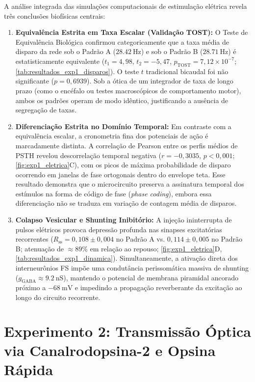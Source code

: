 \documentclass[12pt,openright,oneside,a4paper,brazil]{abntex2}
\begin{document}
A análise integrada das simulações computacionais de estimulação elétrica revela três conclusões biofísicas centrais:
\begin{enumerate}
    \item \textbf{Equivalência Estrita em Taxa Escalar (Validação TOST):} O Teste de Equivalência Biológica confirmou categoricamente que a taxa média de disparo da rede sob o Padrão A ($\qty{28.42}{\hertz}$) e sob o Padrão B ($\qty{28.71}{\hertz}$) é estatisticamente equivalente ($t_1 = 4{,}98$, $t_2 = -5{,}47$, $p_{\text{TOST}} = 7{,}12 \times 10^{-7}$; \cref{tab:resultados_exp1_disparos}). O teste $t$ tradicional bicaudal foi não significante ($p = 0{,}6939$). Sob a ótica de um integrador de taxa de longo prazo (como o encéfalo ou testes macroscópicos de comportamento motor), ambos os padrões operam de modo idêntico, justificando a ausência de segregação de taxas.
    \item \textbf{Diferenciação Estrita no Domínio Temporal:} Em contraste com a equivalência escalar, a cronometria fina dos potenciais de ação é marcadamente distinta. A correlação de Pearson entre os perfis médios de PSTH revelou descorrelação temporal negativa ($r = -0{,}3035$, $p < 0{,}001$; \cref{fig:exp1_eletrica}C), com os picos de máxima probabilidade de disparo ocorrendo em janelas de fase ortogonais dentro do envelope teta. Esse resultado demonstra que o microcircuito preserva a assinatura temporal dos estímulos na forma de código de fase (\emph{phase coding}), embora essa diferenciação não se traduza em variação de contagem média de disparos.
    \item \textbf{Colapso Vesicular e Shunting Inibitório:} A injeção ininterrupta de pulsos elétricos provoca depressão profunda nas sinapses excitatórias recorrentes ($R_{\text{ss}} = 0{,}108 \pm 0{,}004$ no Padrão A vs. $0{,}114 \pm 0{,}005$ no Padrão B; atenuação de $\approx 89\%$ em relação ao repouso; \cref{fig:exp1_eletrica}D, \cref{tab:resultados_exp1_dinamica}). Simultaneamente, a ativação direta dos interneurônios FS impõe uma condutância perissomática massiva de shunting ($g_{\text{GABA}} \approx \qty{9.2}{\nano\siemens}$), mantendo o potencial de membrana piramidal ancorado próximo a $\qty{-68}{\milli\volt}$ e impedindo a propagação reverberante da excitação ao longo do circuito recorrente.
\end{enumerate}

\section{Experimento 2: Transmissão Óptica via Canalrodopsina-2 e Opsina Rápida}
\end{document}
